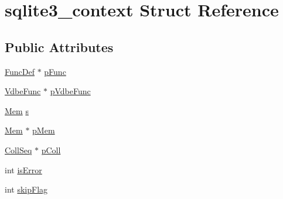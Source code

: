 \hypertarget{structsqlite3__context}{\section{sqlite3\-\_\-context Struct Reference}
\label{structsqlite3__context}
}
\subsection*{Public Attributes}
\begin{DoxyCompactItemize}
\item 
\hyperlink{struct_func_def}{Func\-Def} $\ast$ \hyperlink{structsqlite3__context_af4215c87be2c0cb10868f623a552a2aa}{p\-Func}
\item 
\hyperlink{struct_vdbe_func}{Vdbe\-Func} $\ast$ \hyperlink{structsqlite3__context_af35405f4f62cfc0b81bb2eb6c82b2363}{p\-Vdbe\-Func}
\item 
\hyperlink{struct_mem}{Mem} \hyperlink{structsqlite3__context_a53d44518a1f7f57ce5a2d73b6e8d2c14}{s}
\item 
\hyperlink{struct_mem}{Mem} $\ast$ \hyperlink{structsqlite3__context_a7b84aa5920329cb0eb943832175b48b5}{p\-Mem}
\item 
\hyperlink{struct_coll_seq}{Coll\-Seq} $\ast$ \hyperlink{structsqlite3__context_a4e4b12fb65814515fdb967559693f816}{p\-Coll}
\item 
int \hyperlink{structsqlite3__context_ae4351b8da8c6d2676074612c1b8d4af5}{is\-Error}
\item 
int \hyperlink{structsqlite3__context_aaee18da17fe31959469aa1ca9b9e1406}{skip\-Flag}
\end{DoxyCompactItemize}


